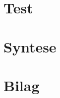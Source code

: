 \chapter{Test}


\chapter{Syntese}
%
%

\begingroup
\raggedright



%
%

\endgroup

\appendix
\chapter{Bilag}



